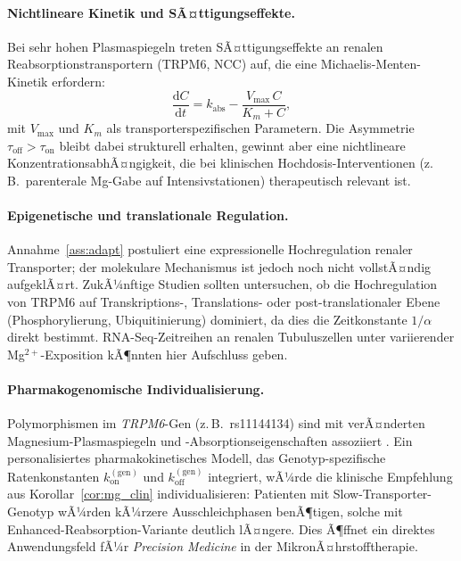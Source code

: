 ﻿\documentclass[12pt,a4paper]{article}
\theoremstyle{plain}
\theoremstyle{definition}
\theoremstyle{remark}
\begin{document}
\paragraph{Nichtlineare Kinetik und SÃ¤ttigungseffekte.}
Bei sehr hohen Plasmaspiegeln treten SÃ¤ttigungseffekte an renalen
Reabsorptionstransportern (TRPM6, NCC) auf, die eine Michaelis-Menten-Kinetik
erfordern:
\begin{equation}
  \frac{\mathrm{d}C}{\mathrm{d}t} = k_\text{abs} - \frac{V_{\max} \, C}{K_m + C},
\end{equation}
mit $V_{\max}$ und $K_m$ als transporterspezifischen Parametern. Die
Asymmetrie $\tau_\text{off} > \tau_\text{on}$ bleibt dabei strukturell
erhalten, gewinnt aber eine nichtlineare KonzentrationsabhÃ¤ngigkeit, die
bei klinischen Hochdosis-Interventionen (z.\,B.\ parenterale Mg-Gabe auf
Intensivstationen) therapeutisch relevant ist.

\paragraph{Epigenetische und translationale Regulation.}
Annahme~\ref{ass:adapt} postuliert eine expressionelle Hochregulation renaler
Transporter; der molekulare Mechanismus ist jedoch noch nicht vollstÃ¤ndig
aufgeklÃ¤rt. ZukÃ¼nftige Studien sollten untersuchen, ob die Hochregulation
von TRPM6 auf Transkriptions-, Translations- oder post-translationaler Ebene
(Phosphorylierung, Ubiquitinierung) dominiert, da dies die Zeitkonstante
$1/\alpha$ direkt bestimmt. RNA-Seq-Zeitreihen an renalen Tubuluszellen unter
variierender Mg$^{2+}$-Exposition kÃ¶nnten hier Aufschluss geben.

\paragraph{Pharmakogenomische Individualisierung.}
Polymorphismen im \textit{TRPM6}-Gen (z.\,B.\ rs11144134) sind mit
verÃ¤nderten Magnesium-Plasmaspiegeln und -Absorptionseigenschaften assoziiert
\cite{DiNicolantonio2018}. Ein personalisiertes pharmakokinetisches Modell,
das Genotyp-spezifische Ratenkonstanten $k_\text{on}^{(\text{gen})}$ und
$k_\text{off}^{(\text{gen})}$ integriert, wÃ¼rde die klinische Empfehlung
aus Korollar~\ref{cor:mg_clin} individualisieren: Patienten mit
Slow-Transporter-Genotyp wÃ¼rden kÃ¼rzere Ausschleichphasen benÃ¶tigen,
solche mit Enhanced-Reabsorption-Variante deutlich lÃ¤ngere. Dies Ã¶ffnet ein
direktes Anwendungsfeld fÃ¼r \emph{Precision Medicine} in der
MikronÃ¤hrstofftherapie.
\end{document}
